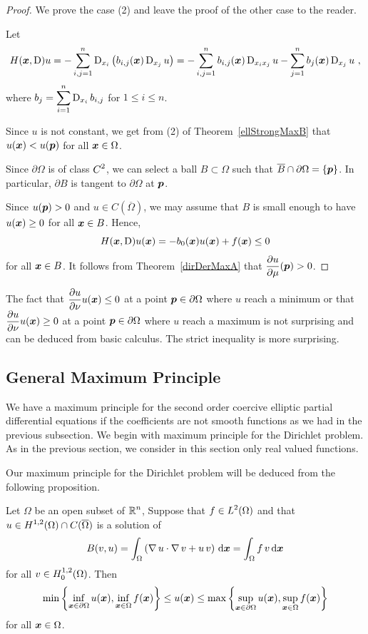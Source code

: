 \begin{proof}
We prove the case (2) and leave the proof of the other case to the reader.

Let
\[
H({\bm{x}},\operatorname{D})u = - \sum_{i,j=1}^n
\operatorname{D}_{x_i} \left( b_{i,j}({\bm{x}}) \operatorname{D}_{x_j} u \right)
= - \sum_{i,j=1}^n b_{i,j}({\bm{x}}) \operatorname{D}_{x_i x_j} u
- \sum_{j=1}^n b_j({\bm{x}}) \operatorname{D}_{x_j} u \ ,
\]
where $\displaystyle b_j = \sum_{i=1}^n \operatorname{D}_{x_i} b_{i,j}$ for
$1 \leq i \leq n$.

Since $u$ is not constant, we get from (2) of Theorem~\ref{ellStrongMaxB}
that $u({\bm{x}}) < u({\bm{p}})$ for all ${\bm{x}} \in \Omega$.

Since $\partial \Omega$ is of class $\displaystyle C^2$, we can select a ball
$B \subset \Omega$ such that $\overline{B} \cap \partial \Omega = \{{\bm{p}}\}$.
In particular, $\partial B$ is tangent to $\partial \Omega$ at ${\bm{p}}$.

Since $u({\bm{p}}) > 0$ and $u \in C(\overline{\Omega})$, we may assume
that $B$ is small enough to have $u({\bm{x}}) \geq 0$ for all
${\bm{x}} \in B$.  Hence,
\[
H({\bm{x}},\operatorname{D}) u({\bm{x}}) = -b_0({\bm{x}}) u({\bm{x}}) + f({\bm{x}}) \leq 0
\]
for all ${\bm{x}} \in B$.  It follows from Theorem~\ref{dirDerMaxA}
that $\displaystyle \frac{\partial{u}}{\partial \mu}({\bm{p}}) > 0$.
\end{proof}

The fact that $\displaystyle \frac{\partial{u}}{\partial \nu} u({\bm{x}}) \leq 0$ 
at a point ${\bm{p}} \in \partial \Omega$ where $u$ reach a minimum or
that $\displaystyle \frac{\partial{u}}{\partial \nu} u({\bm{x}}) \geq 0$ 
at a point ${\bm{p}} \in \partial \Omega$ where $u$ reach a maximum is
not surprising and can be deduced from basic calculus.  The strict
inequality is more surprising.

\subsection{General Maximum Principle}

We have a maximum principle for the second order coercive elliptic
partial differential equations if the coefficients are not smooth
functions as we had in the previous subsection.  We begin with maximum
principle for the Dirichlet problem.  As in the previous section, we
consider in this section only real valued functions.

Our maximum principle for the Dirichlet problem will be deduced from
the following proposition.

\begin{prop} \label{ell_max_DP}
Let $\Omega$ be an open subset of $\displaystyle \mathbb{R}^n$,  Suppose that
$\displaystyle f\in L^2(\Omega)$ and that
$\displaystyle u\in H^{1,2}(\Omega)\cap C(\overline{\Omega})$ is a solution of
\begin{equation} \label{ell_max_eq1}
B(v,u) = \int_\Omega \left( \operatorname{\nabla} u \cdot \operatorname{\nabla} v + u\,v \right) \,\mathrm{d}{{\bm{x}}}
= \int_\Omega f\,v \,\mathrm{d}{{\bm{x}}}
\end{equation}
for all $\displaystyle v \in H^{1,2}_0(\Omega)$.  Then
\[
\min\left\{ \inf_{{\bm{x}}\in \partial \Omega} u({\bm{x}}),
\inf_{{\bm{x}}\in \Omega} f({\bm{x}}) \right\} \leq u({\bm{x}}) \leq
\max\left\{ \sup_{{\bm{x}}\in \partial \Omega} u({\bm{x}}),
\sup_{{\bm{x}}\in \Omega} f({\bm{x}}) \right\}
\]
for all ${\bm{x}} \in \Omega$.
\end{prop}

